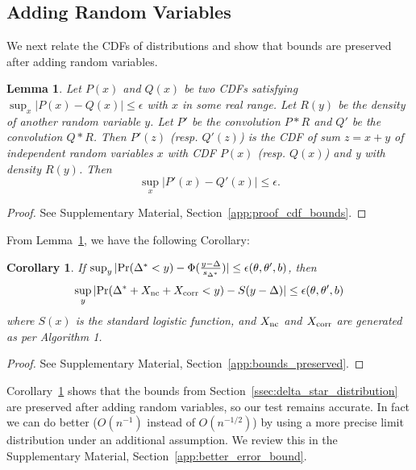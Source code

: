 \documentclass[twoside]{article} \usepackage{aistats2017}
\newtheorem{lemma}{Lemma}
\newtheorem{corollary}{Corollary}
\begin{document}
\subsection{Adding Random Variables}\label{ssec:preserve_bounds}

We next relate the CDFs of distributions and show that bounds are preserved
after adding random variables.

\begin{lemma}\label{lem:cdf_bounds}
Let $P(x)$ and $Q(x)$ be two CDFs satisfying
$\sup_x|P(x)-Q(x)|\leq \epsilon$ with $x$ in some real range. Let $R(y)$ be the
{\em density} of another random variable $y$. Let $P'$ be the convolution $P*R$
and $Q'$ be the convolution $Q*R$. Then $P'(z)$ (resp. $Q'(z)$) is the CDF of
sum $z=x+y$ of independent random variables $x$ with CDF $P(x)$ (resp. $Q(x)$)
and y with density $R(y)$.  Then
\begin{equation}
    \sup_x|P'(x)-Q'(x)|\leq \epsilon.
\end{equation}
\end{lemma}
\begin{proof}
See Supplementary Material, Section~\ref{app:proof_cdf_bounds}.
\end{proof}

From Lemma~\ref{lem:cdf_bounds}, we have the following Corollary:

\begin{corollary}\label{cor:bounds_preserved}
If $\sup_y|{\rm Pr}(\Delta^* < y) - \Phi(\frac{y-\Delta}{s_{\Delta^*}})|
\leq \epsilon(\theta,\theta',b)$, then
\[
    \sup_y|{\rm Pr}(\Delta^*+X_{\rm nc}+X_{\rm corr} < y) - S(y-\Delta)| \leq \epsilon(\theta,\theta',b)
\]
where $S(x)$ is the standard logistic function, and $X_{\rm nc}$ and $X_{\rm corr}$ are generated as per Algorithm 1. 
\end{corollary}

\begin{proof}
See Supplementary Material, Section~\ref{app:bounds_preserved}.
\end{proof}

Corollary~\ref{cor:bounds_preserved} shows that the bounds from
Section~\ref{ssec:delta_star_distribution} are preserved after adding 
random variables, so our test remains accurate.  In fact we can do better
($O(n^{-1})$ instead of $O(n^{-1/2})$) by using a more precise limit
distribution under an additional assumption. We review this in the Supplementary
Material, Section~\ref{app:better_error_bound}.
\end{document}
